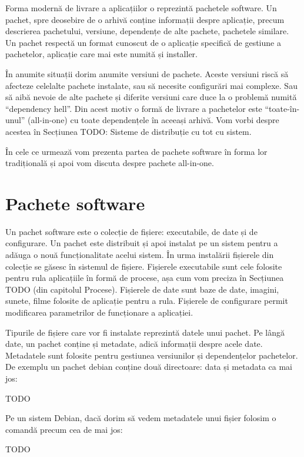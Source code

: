 Forma modernă de livrare a aplicațiilor o reprezintă pachetele software. Un pachet, spre deosebire de o arhivă conține informații despre aplicație, precum descrierea pachetului, versiune, dependențe de alte pachete, pachetele similare. Un pachet respectă un format cunoscut de o aplicație specifică de gestiune a pachetelor, aplicație care mai este numită și installer.

În anumite situații dorim anumite versiuni de pachete. Aceste versiuni riscă să afecteze celelalte pachete instalate, sau să necesite configurări mai complexe. Sau să aibă nevoie de alte pachete și diferite versiuni care duce la o problemă numită “dependency hell”. Din acest motiv o formă de livrare a pachetelor este “toate-în-unul” (all-in-one) cu toate dependențele în aceeași arhivă. Vom vorbi despre acestea în Secțiunea TODO: Sisteme de distribuție cu tot cu sistem.

În cele ce urmează vom prezenta partea de pachete software în forma lor tradițională și apoi vom discuta despre pachete all-in-one.

\section{Pachete software}
\label{sec:package:overview}

Un pachet software este o colecție de fișiere: executabile, de date și de configurare. Un pachet este distribuit și apoi instalat pe un sistem pentru a adăuga o nouă funcționalitate acelui sistem. În urma instalării fișierele din colecție se găsesc în sistemul de fișiere. Fișierele executabile sunt cele folosite pentru rula aplicațiile în formă de procese, așa cum vom preciza în Secțiunea TODO (din capitolul Procese). Fișierele de date sunt baze de date, imagini, sunete, filme folosite de aplicație pentru a rula. Fișierele de configurare permit modificarea parametrilor de funcționare a aplicației.

Tipurile de fișiere care vor fi instalate reprezintă datele unui pachet. Pe lângă date, un pachet conține și metadate, adică informații despre acele date. Metadatele sunt folosite pentru gestiunea versiunilor și dependențelor pachetelor. De exemplu un pachet debian conține două directoare: data și metadata ca mai jos:

TODO

Pe un sistem Debian, dacă dorim să vedem metadatele unui fișier folosim o comandă precum cea de mai jos:

TODO

